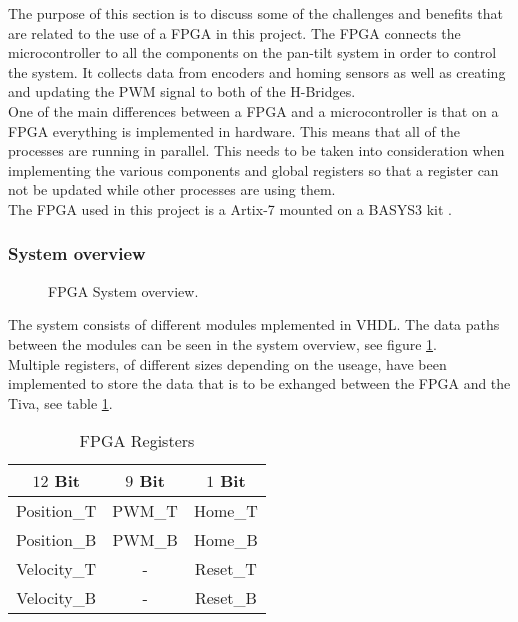 \documentclass[../../../main]{subfiles}
\begin{document}
The purpose of this section is to discuss some of the challenges and benefits that are related to the use of a FPGA in this project.
The FPGA connects the microcontroller to all the components on the pan-tilt system in order to control the system. It collects data from encoders and homing sensors as well as creating and updating the PWM signal to both of the H-Bridges.
\\
One of the main differences between a FPGA and a microcontroller is that on a FPGA everything is implemented in hardware. This means that all of the processes are running in parallel.
This needs to be taken into consideration when implementing the various components and global registers so that a register can not be updated while other processes are using them.
\\
The FPGA used in this project is a Artix-7 mounted on a BASYS3 kit \cite{xilinx2019fpga}.
\subsubsection{System overview}%
\label{sub:system_overview}

\begin{figure}[H]
  \centering
  \def\svgwidth{\textwidth}
  
  \caption{FPGA System overview.}
  \label{fig:FPGA_system_overview}
\end{figure}
The system consists of different modules mplemented in VHDL.
The data paths between the modules can be seen in the system overview, see figure \ref{fig:FPGA_system_overview}.
\\
Multiple registers, of different sizes depending on the useage, have been implemented to store the data that is to be exhanged between the FPGA and the Tiva, see table \ref{table:FPGA_registers}.
\begin{table}[H]
\centering
\begin{tabular}{|c|c|c|}
\hline
\textbf{$12$ Bit} & \textbf{$9$ Bit} & \textbf{$1$ Bit} \\ \hline
Position\_T     & PWM\_T         & Home\_T        \\ \hline
Position\_B     & PWM\_B         & Home\_B        \\ \hline
Velocity\_T     & -              & Reset\_T       \\ \hline
Velocity\_B     & -              & Reset\_B       \\ \hline
\end{tabular}
\caption{FPGA Registers}
\label{table:FPGA_registers}
\end{table}
\end{document}
